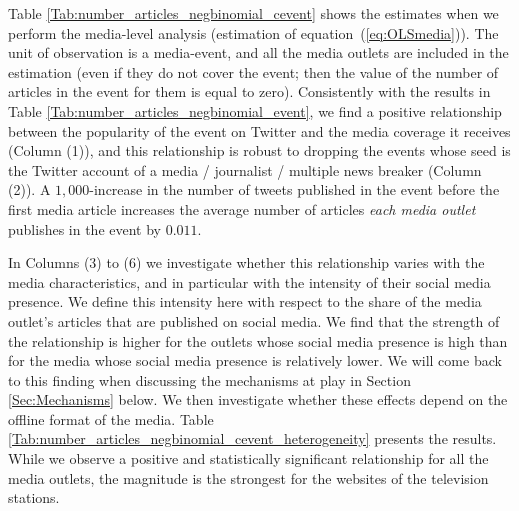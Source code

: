 Table \ref{Tab:number_articles_negbinomial_cevent} shows the estimates when we perform the media-level analysis (estimation of equation~(\ref{eq:OLSmedia})). The unit of observation is a media-event, and all the media outlets are included in the estimation (even if they do not cover the event; then the value of the number of articles in the event for them is equal to zero). Consistently with the results in Table \ref{Tab:number_articles_negbinomial_event}, we find a positive relationship between the popularity of the event on Twitter and the media coverage it receives (Column (1)), and this relationship is robust to dropping the events whose seed is the Twitter account of a media / journalist / multiple news breaker (Column (2)). A $1,000$-increase in the number of tweets published in the event before the first media article increases the average number of articles \textit{each media outlet} publishes in the event by $0.011$. 

In Columns (3) to (6) we investigate whether this relationship varies with the media characteristics, and in particular with the intensity of their social media presence. We define this intensity here with respect to the share of the media outlet's articles that are published on social media. We find that the strength of the relationship is higher for the outlets whose social media presence is high than for the media whose social media presence is relatively lower. We will come back to this finding when discussing the mechanisms at play in Section \ref{Sec:Mechanisms} below. We then investigate whether these effects depend on the offline format of the media. Table \ref{Tab:number_articles_negbinomial_cevent_heterogeneity} presents the results. While we observe a positive and statistically significant relationship for all the media outlets, the magnitude is the strongest for the websites of the television stations.


